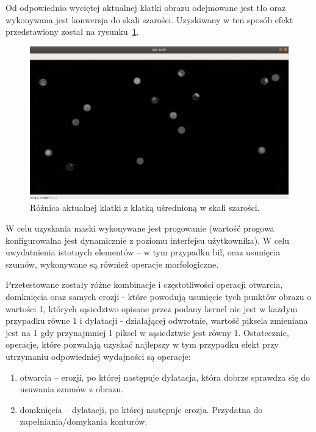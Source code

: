 \documentclass[12pt]{article}
\begin{document}
    Od odpowiednio wyciętej aktualnej klatki obrazu odejmowane jest tło  oraz wykonywana jest konwersja do skali szarości. Uzyskiwany w ten sposób efekt przedstawiony został na rysunku~\ref{bp_diff}.

    \begin{figure}[h]
        \centering
        \includegraphics[width=15cm]{./images/obrazki/bp/bp_diff.png}
        \caption{Różnica aktualnej klatki z klatką uśrednioną w skali szarości.}
        \label{bp_diff}
    \end{figure}


    W celu uzyskania maski wykonywane jest progowanie (wartość progowa konfigurowalna jest dynamicznie z poziomu interfejsu użytkownika). W celu uwydatnienia istotnych elementów – w tym przypadku bil, oraz usunięcia szumów, wykonywane są również operacje morfologiczne.
    \vspace{0.5cm}
    
    Przetestowane zostały różne kombinacje i częstotliwości operacji otwarcia, domknięcia oraz samych erozji - które powodują usunięcie tych punktów obrazu o wartości 1, których sąsiedztwo opisane przez podany kernel nie jest w każdym przypadku równe 1 i dylatacji - działającej odwrotnie, wartość piksela zmieniana jest na 1 gdy przynajmniej 1 piksel w sąsiedztwie jest równy 1. Ostatecznie, operacje, które pozwalają uzyskać najlepszy w tym przypadku efekt przy utrzymaniu odpowiedniej wydajności są operacje:

    \begin{enumerate}
        \item otwarcia – erozji, po której następuje dylatacja, która dobrze sprawdza się do usuwania szumów z obrazu.
        \item domknięcia – dylatacji, po której następuje erozja. Przydatna do zapełniania/domykania konturów.
    \end{enumerate}
\end{document}
